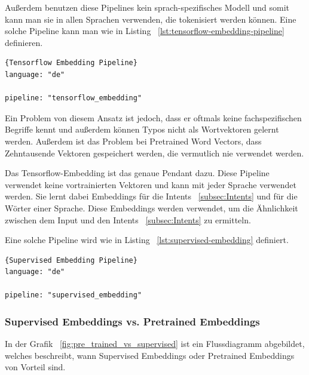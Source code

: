 Außerdem benutzen diese Pipelines kein sprach-spezifisches Modell und somit kann man sie in allen Sprachen verwenden, die tokenisiert werden können.
Eine solche Pipeline kann man wie in Listing ~\ref{lst:tensorflow-embedding-pipeline} definieren.\cite{tensorFlowEmbedding}

\begin{lstlisting}[label={lst:tensorflow-embedding-pipeline},caption={Tensorflow Embedding Pipeline}]{Tensorflow Embedding Pipeline}
language: "de"

pipeline: "tensorflow_embedding"
\end{lstlisting}

Ein Problem von diesem Ansatz ist jedoch, dass er oftmals keine fachspezifischen Begriffe kennt und außerdem können Typos nicht als Wortvektoren gelernt werden.
Außerdem ist das Problem bei Pretrained Word Vectors, dass Zehntausende Vektoren gespeichert werden, die vermutlich nie verwendet werden.\cite{tensorFlowEmbedding, choosingPipeline}

Das Tensorflow-Embedding ist das genaue Pendant dazu.
Diese Pipeline verwendet keine vortrainierten Vektoren und kann mit jeder Sprache verwendet werden.
Sie lernt dabei Embeddings für die Intents ~\ref{subsec:Intents} und für die Wörter einer Sprache.
Diese Embeddings werden verwendet, um die Ähnlichkeit zwischen dem Input und den Intents ~\ref{subsec:Intents} zu ermitteln.\cite{tensorFlowEmbedding, choosingPipeline}

Eine solche Pipeline wird wie in Listing ~\ref{lst:supervised-embedding} definiert.

\begin{lstlisting}[label={lst:supervised-embedding},caption={Supervised Embedding Pipeline}]{Supervised Embedding Pipeline}
language: "de"

pipeline: "supervised_embedding"
\end{lstlisting}

\subsubsection{Supervised Embeddings vs. Pretrained Embeddings}\label{subsubsec:supervised-embedding-vs-pretrained-embedding}

In der Grafik ~\ref{fig:pre_trained_vs_supervised} ist ein Flussdiagramm abgebildet, welches beschreibt, wann Supervised Embeddings oder Pretrained Embeddings von Vorteil sind.

